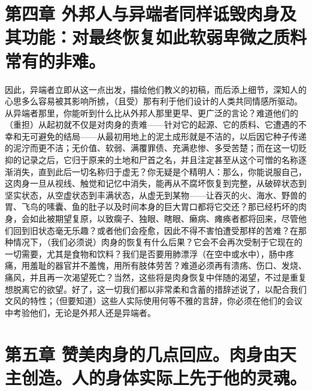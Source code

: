 
\section{第四章  外邦人与异端者同样诋毁肉身及其功能：对最终恢复如此软弱卑微之质料常有的非难。}

因此，异端者立即从这一点出发，描绘他们教义的初稿，而后添上细节，深知人的心思多么容易被其影响所掳，（且受）那有利于他们设计的人类共同情感所驱动。从异端者那里，你能听到什么比从外邦人那里更早、更广泛的言论？难道他们的（重担）从起初就不仅是对肉身的责难——针对它的起源、它的质料、它遭遇的不幸和无可避免的结局——从最初用地上的泥土成形就是不洁的，以后因它种子传递的泥泞而更不洁；无价值、软弱、满覆罪债、充满悲惨、多受苦楚；而在这一切贬抑的记录之后，它归于原来的土地和尸首之名，并且注定甚至从这个可憎的名称逐渐消失，直到此后一切名称归于虚无？你无疑是个精明人：那么，你能说服自己，这肉身一旦从视线、触觉和记忆中消失，能再从不腐坏恢复到完整，从破碎状态到坚实状态，从空虚状态到丰满状态，从虚无到某物——让吞灭的火、海水、野兽的胃、飞鸟的嗉囊、鱼的肚子以及时间本身的巨大胃口都将它交还？那已经朽坏的肉身，会如此被期望复原，以致瘸子、独眼、瞎眼、癞病、瘫痪者都将回来，尽管他们回到旧状态毫无乐趣？或者他们会痊愈，因此不得不害怕遭受那样的苦难？在那种情况下，（我们必须说）肉身的恢复有什么后果？它会不会再次受制于它现在的一切需要，尤其是食物和饮料？我们是否要用肺漂浮（在空中或水中），肠中疼痛，用羞耻的器官并不羞愧，用所有肢体劳苦？难道必须再有溃疡、伤口、发烧、痛风，并且再一次渴望死亡？当然，这些将是肉身恢复中伴随的渴望，不过是重复想脱离它的欲望。好了，这一切我们都以非常柔和含蓄的措辞述说了，以配合我们文风的特性；（但要知道）这些人实际使用何等不雅的言辞，你必须在他们的会议中考验他们，无论是外邦人还是异端者。\par


\section{第五章  赞美肉身的几点回应。肉身由天主创造。人的身体实际上先于他的灵魂。}


